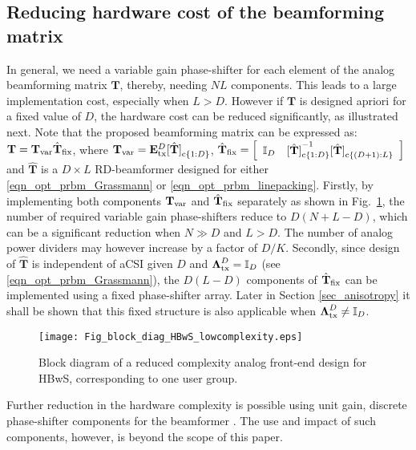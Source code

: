 \documentclass[journal,comsoc]{IEEEtran}
\begin{document}
\subsection{Reducing hardware cost of the beamforming matrix} \label{sec_hardware_pp}
In general, we need a variable gain phase-shifter for each element of the analog beamforming matrix $\mathbf{T}$, thereby, needing $NL$ components. This leads to a large implementation cost, especially when $L > D$. However if $\mathbf{T}$ is designed apriori for a fixed value of $D$, the hardware cost can be reduced significantly, as illustrated next. 
%
%
Note that the proposed beamforming matrix can be expressed as: $\mathbf{T} = \mathbf{T}_{\rm var} \hat{\mathbf{T}}_{\rm fix}$, where $\mathbf{T}_{\rm var} = \mathbf{E}_{\rm tx}^{D} {[\hat{\mathbf{T}}]}_{{\rm c}\{1:D\}}$, $\hat{\mathbf{T}}_{\rm fix} = \left[ \begin{array}{cc} \mathbb{I}_{D}  & {[\hat{\mathbf{T}}]}_{{\rm c}\{1:D\}}^{-1} {[\hat{\mathbf{T}}]}_{{\rm c}\{(D+1):L\}} \end{array} \right]$ and $\hat{\mathbf{T}}$ is a $D \times L$ RD-beamformer designed for either \eqref{eqn_opt_prbm_Grassmann} or \eqref{eqn_opt_prbm_linepacking}. Firstly, by implementing both components $\mathbf{T}_{\rm var}$ and $\hat{\mathbf{T}}_{\rm fix}$ separately as shown in Fig.~\ref{Fig_blockdiag_restrict_sel}, the number of required variable gain phase-shifters reduce to $D(N + L - D)$, which can be a significant reduction when $N \gg D$ and $L > D$. The number of analog power dividers may however increase by a factor of $D/K$.
%
Secondly, since design of $\hat{\mathbf{T}}$ is independent of aCSI given $D$ and $\boldsymbol{\Lambda}_{\rm tx}^{D} = \mathbb{I}_D$ (see \eqref{eqn_opt_prbm_Grassmann}), the $D(L-D)$ components of $\hat{\mathbf{T}}_{\rm fix}$ can be implemented using a fixed phase-shifter array. Later in Section \ref{sec_anisotropy} it shall be shown that this fixed structure is also applicable when $\boldsymbol{\Lambda}_{\rm tx}^{D} \neq \mathbb{I}_D$.
%
\begin{figure}[!h]
\centering
\texttt{[image: Fig\_block\_diag\_HBwS\_lowcomplexity.eps]}
\caption{Block diagram of a reduced complexity analog front-end design for HBwS, corresponding to one user group.}
\label{Fig_blockdiag_restrict_sel}
\end{figure}
%
Further reduction in the hardware complexity is possible using unit gain, discrete phase-shifter components for the beamformer \cite{Molisch_VarPhaseShift, Sudarshan, Alkhateeb2013}. The use and impact of such components, however, is beyond the scope of this paper. 
%
\end{document}
